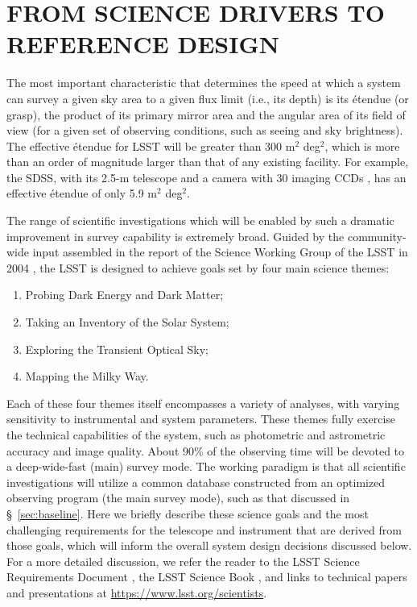 \section{  FROM SCIENCE DRIVERS TO REFERENCE DESIGN}
\label{Sec:refdesign}

The most important characteristic that determines the speed at which a system can
survey a given sky area to a given flux limit (i.e., its depth) is its \'etendue
(or grasp), the product of its primary mirror area and the angular
area of its field of view (for a given set of observing conditions, such as
seeing and sky brightness).
The effective \'etendue for LSST will be greater than 300 m$^2$ deg$^2$, which
is more than an order of magnitude larger than that of any existing facility.
For example, the SDSS, with its 2.5-m telescope \citep{2006AJ....131.2332G} and a
camera with 30 imaging CCDs \citep{1998AJ....116.3040G}, has an effective \'etendue of
only 5.9 m$^2$ deg$^2$.

The range of scientific investigations which will be enabled by such a
dramatic improvement in survey capability is extremely broad. Guided by
the community-wide input assembled in the report of the Science Working Group of the
LSST in 2004 \citep{Document-26952}, the LSST is designed to
achieve goals set by four main science themes:

\begin{enumerate}
\item Probing Dark Energy and Dark Matter;
\item Taking an Inventory of the Solar System;
\item Exploring the Transient Optical Sky;
\item Mapping the Milky Way.
\end{enumerate}

Each of these four themes itself encompasses a variety of analyses, with
varying sensitivity to instrumental and system parameters. These themes
fully exercise the technical capabilities of the system, such as photometric
and astrometric accuracy and image quality. About 90\% of the observing time
will be devoted to a deep-wide-fast (main) survey mode. The working paradigm is that all
scientific investigations will utilize a common database constructed from an optimized
observing program (the main survey mode), such as that discussed in
\S~\ref{sec:baseline}.
Here we briefly describe these science goals and the most challenging requirements for the
telescope and instrument that are derived from those goals, which will
inform the overall system design decisions discussed below.
For a more detailed discussion, we refer the reader to the LSST Science Requirements
Document \citep{LPM-17}, the LSST Science Book
\citep[][hereafter SciBook]{2009arXiv0912.0201L},
and links to technical papers and presentations at
\url{https://www.lsst.org/scientists}.


